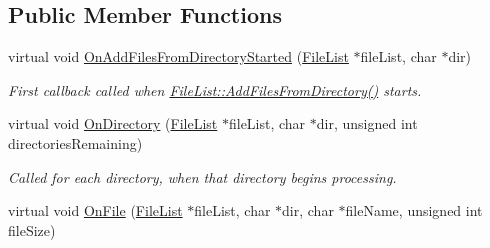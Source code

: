 \subsection*{Public Member Functions}
\begin{DoxyCompactItemize}
\item 
\hypertarget{class_rak_net_1_1_file_list_progress_a32e9ee5b00bc4518202cd0dcf36d0ba7}{virtual void \hyperlink{class_rak_net_1_1_file_list_progress_a32e9ee5b00bc4518202cd0dcf36d0ba7}{On\-Add\-Files\-From\-Directory\-Started} (\hyperlink{class_rak_net_1_1_file_list}{File\-List} $\ast$file\-List, char $\ast$dir)}\label{class_rak_net_1_1_file_list_progress_a32e9ee5b00bc4518202cd0dcf36d0ba7}

\begin{DoxyCompactList}\small\item\em First callback called when \hyperlink{class_rak_net_1_1_file_list_a9ff81c1d5fb8ad1897fd6b6b12108cf8}{File\-List\-::\-Add\-Files\-From\-Directory()} starts. \end{DoxyCompactList}\item 
\hypertarget{class_rak_net_1_1_file_list_progress_ad3919d586c578255ecd543fde45eaf5c}{virtual void \hyperlink{class_rak_net_1_1_file_list_progress_ad3919d586c578255ecd543fde45eaf5c}{On\-Directory} (\hyperlink{class_rak_net_1_1_file_list}{File\-List} $\ast$file\-List, char $\ast$dir, unsigned int directories\-Remaining)}\label{class_rak_net_1_1_file_list_progress_ad3919d586c578255ecd543fde45eaf5c}

\begin{DoxyCompactList}\small\item\em Called for each directory, when that directory begins processing. \end{DoxyCompactList}\item 
\hypertarget{class_rak_net_1_1_file_list_progress_af8ee3a3b95dc9eb4851af6055fb4f82b}{virtual void \hyperlink{class_rak_net_1_1_file_list_progress_af8ee3a3b95dc9eb4851af6055fb4f82b}{On\-File} (\hyperlink{class_rak_net_1_1_file_list}{File\-List} $\ast$file\-List, char $\ast$dir, char $\ast$file\-Name, unsigned int file\-Size)}\label{class_rak_net_1_1_file_list_progress_af8ee3a3b95dc9eb4851af6055fb4f82b}


\end{DoxyCompactItemize}
